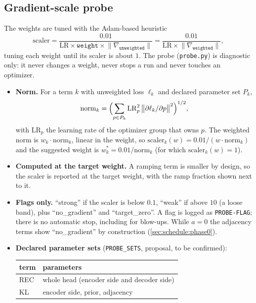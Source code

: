 \subsection{Gradient-scale probe}
\label{sec:schedule:gradlog}
The weights are tuned with the Adam-based heuristic
\begin{equation}
\mathrm{scaler}=
\frac{0.01}{\mathrm{LR}\times\texttt{weight}\times\lVert\nabla_{\texttt{unweighted}}\rVert}=
\frac{0.01}{\mathrm{LR}\times\lVert\nabla_{\texttt{weighted}}\rVert},
\label{eq:scaler}
\end{equation}
tuning each weight until its scaler is about $1$. The probe (\texttt{probe.py}) is
diagnostic only: it never changes a weight, never stops a run and never touches an
optimizer.
\begin{itemize}[leftmargin=1.5em]
\item \textbf{Norm.} For a term $k$ with unweighted loss $\ell_k$ and declared
      parameter set $P_k$,
      \[
      \mathrm{norm}_k=\Bigl(\sum_{p\in P_k}\mathrm{LR}_p^2\,\bigl\lVert\partial\ell_k
      /\partial p\bigr\rVert^2\Bigr)^{1/2},
      \]
      with $\mathrm{LR}_p$ the learning rate of the optimizer group that owns $p$. The
      weighted norm is \linebreak 
      $w_k \cdot \mathrm{norm}_k$, linear in the weight, so
      $\mathrm{scaler}_k(w)=0.01/(w \cdot \mathrm{norm}_k)$ and the suggested weight is
      $w^{\ast}_k=0.01/\mathrm{norm}_k$ (for which $\mathrm{scaler}_k(w)=1$).
\item \textbf{Computed at the target weight.} A ramping term is smaller by design, so
      the scaler is reported at the target weight, with the ramp fraction shown next
      to it.
\item \textbf{Flags only.} ``strong'' if the scaler is below $0.1$, ``weak'' if above
      $10$ (a loose band), plus ``no\_gradient'' and ``target\_zero''. A flag is
      logged as \texttt{PROBE-FLAG}; there is no automatic stop, including for
      blow-ups. While $a=0$ the adjacency terms show ``no\_gradient'' by construction
      (\cref{sec:schedule:phase0}).
\item \textbf{Declared parameter sets} (\texttt{PROBE\_SETS}, proposal, to be
      confirmed):
\begin{center}
\begin{tabular}{@{}ll@{}}
\toprule
term & parameters\\
\midrule
REC & whole head (encoder side and decoder side)\\
KL & encoder side, prior, adjacency\\

\end{tabular}
\end{center}
\end{itemize}
